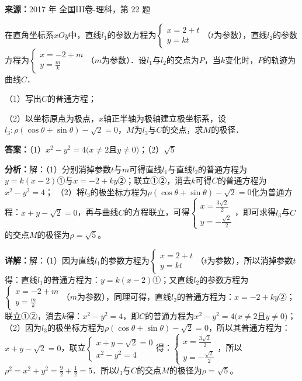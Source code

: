 \begin{question}[points=10]
\textbf{来源：}2017 年 全国III卷-理科，第 22 题\par
在直角坐标系$xOy$中，直线$l_1$的参数方程为$\begin{cases} x=2+t \\ y=kt \end{cases}$（$t$为参数），直线$l_2$的参数方程为$\begin{cases} x=-2+m \\ y=\frac{m}{k} \end{cases}$（$m$为参数）．设$l_1$与$l_2$的交点为$P$，当$k$变化时，$P$的轨迹为曲线$C$．

（1）写出$C$的普通方程；

（2）以坐标原点为极点，$x$轴正半轴为极轴建立极坐标系，设$l_3:\rho(\cos\theta+\sin\theta)-\sqrt{2}=0$，$M$为$l_3$与$C$的交点，求$M$的极径．
\begin{solution}
\textbf{答案：}（1）$x^2-y^2=4(x\neq 2$且$y\neq 0)$；（2）$\sqrt{5}$

\textbf{分析：}解：（1）分别消掉参数$t$与$m$可得直线$l_1$与直线$l_2$的普通方程为$y=k(x-2)$①与$x=-2+ky$②；联立①②，消去$k$可得$C$的普通方程为$x^2-y^2=4$；
（2）将$l_3$的极坐标方程为$\rho(\cos\theta+\sin\theta)-\sqrt{2}=0$化为普通方程：$x+y-\sqrt{2}=0$，再与曲线$C$的方程联立，可得$\begin{cases} x=\frac{3\sqrt{2}}{2} \\ y=-\frac{\sqrt{2}}{2} \end{cases}$，即可求得$l_3$与$C$的交点$M$的极径为$\rho=\sqrt{5}$。

\textbf{详解：}解：（1）因为直线$l_1$的参数方程为$\begin{cases} x=2+t \\ y=kt \end{cases}$（$t$为参数），所以消掉参数$t$得：直线$l_1$的普通方程为：$y=k(x-2)$①；又直线$l_2$的参数方程为$\begin{cases} x=-2+m \\ y=\frac{m}{k} \end{cases}$（$m$为参数），同理可得，直线$l_2$的普通方程为：$x=-2+ky$②；联立①②，消去$k$得：$x^2-y^2=4$，即$C$的普通方程为$x^2-y^2=4(x\neq 2$且$y\neq 0)$；
（2）因为$l_3$的极坐标方程为$\rho(\cos\theta+\sin\theta)-\sqrt{2}=0$，所以其普通方程为：$x+y-\sqrt{2}=0$，联立$\begin{cases} x+y-\sqrt{2}=0 \\ x^2-y^2=4 \end{cases}$得：$\begin{cases} x=\frac{3\sqrt{2}}{2} \\ y=-\frac{\sqrt{2}}{2} \end{cases}$，所以$\rho^2=x^2+y^2=\frac{9}{2}+\frac{1}{2}=5$．所以$l_3$与$C$的交点$M$的极径为$\rho=\sqrt{5}$。
\end{solution}
\end{question}

